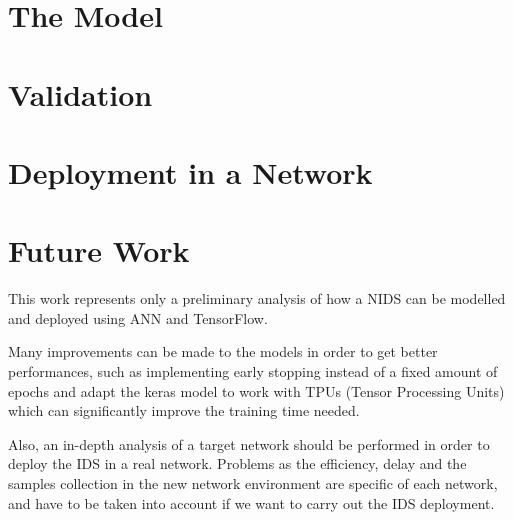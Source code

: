 \documentclass[conference]{IEEEtran}
\begin{document}
\section{The Model}
\label{chapter:the-nn-model}


\section{Validation}
\label{chapter:validation}


\section{Deployment in a Network}
\label{chapter:deployment}


\section{Future Work}
\label{chapter:future}

This work represents only a preliminary analysis of how a NIDS can be modelled and deployed using ANN and TensorFlow.

Many improvements can be made to the models in order to get better performances, such as implementing early stopping instead of a fixed amount of epochs and adapt the keras model to work with TPUs (Tensor Processing Units) which can significantly improve the training time needed.

Also, an in-depth analysis of a target network should be performed in order to deploy the IDS in a real network. Problems as the efficiency, delay and the samples collection in the new network environment are specific of each network, and have to be taken into account if we want to carry out the IDS deployment.




\end{document}
